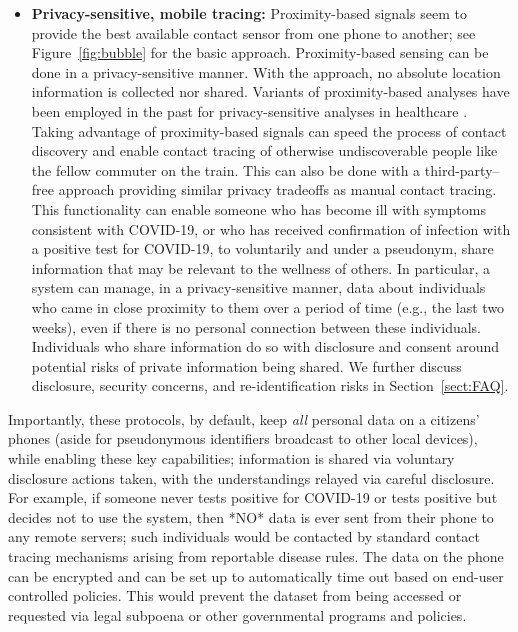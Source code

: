 \documentclass{article}
\begin{document}
\begin{itemize}
\item \textbf{Privacy-sensitive, mobile tracing:} Proximity-based signals seem to provide the best available contact sensor from one phone to another; see Figure~\ref{fig:bubble} for the basic approach. Proximity-based sensing can be done in a privacy-sensitive manner. With the approach, no absolute location information is collected nor shared. Variants of proximity-based analyses have been employed in the past for privacy-sensitive analyses in healthcare \cite{white2012}. Taking advantage of proximity-based signals can speed the process of contact discovery and enable contact tracing of otherwise undiscoverable people like the fellow commuter on the train.  This can also be done with a third-party--free approach providing similar privacy tradeoffs as manual contact tracing.  
This functionality can enable someone who has become ill with symptoms consistent with COVID-19, or who has received confirmation of infection with a positive test for COVID-19, to voluntarily and under a pseudonym, share information that may be relevant to the wellness of others.  In particular, a system can manage, in a privacy-sensitive manner, data about individuals who came in close proximity to them over a period of time (e.g., the last two weeks), even if there is no personal connection between these individuals.
 Individuals who share information do so with disclosure and consent around potential risks of private information being shared.  We further discuss disclosure, security concerns, and re-identification risks in Section~\ref{sect:FAQ}.
\end{itemize}



Importantly, these protocols, by default, keep \emph{all} personal data on a citizens' phones (aside for pseudonymous identifiers broadcast to other local devices), while enabling these key capabilities; information is shared via voluntary disclosure actions taken, with the understandings relayed via careful disclosure. For example, if someone never tests positive for COVID-19 or tests positive but decides not to use the system, then *NO* data is ever sent from their phone to any remote servers; such individuals
would be contacted by standard contact tracing mechanisms arising from reportable disease rules. The data on the phone can be encrypted and can be set up to automatically time out based on end-user controlled policies.  This would prevent the dataset from being accessed or requested via legal subpoena or other governmental programs and policies. 
\end{document}
